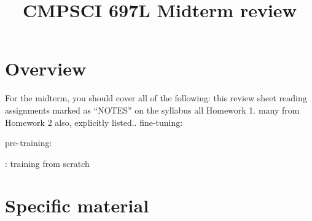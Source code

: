 \documentclass[10pt,letterpaper]{article}
\title{
  \textbf{CMPSCI 697L Midterm review}
}
\date{}
\begin{document}
\maketitle

\section{Overview}

For the midterm, you should cover all of the following:
\subitem this review sheet
\subitem reading assignments marked as “NOTES” on the syllabus
\subitem all Homework 1. many from Homework 2 also, explicitly listed..
fine-tuning:

\par
pre-training:

\par:
training from scratch

\section{Specific material}
\end{document}
